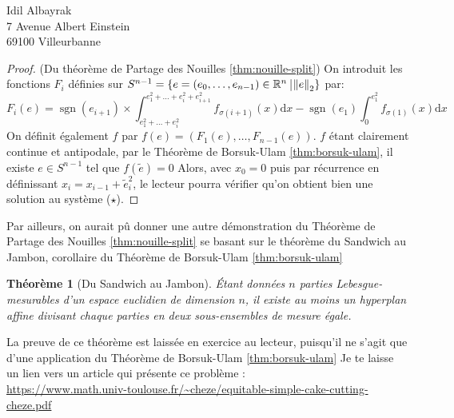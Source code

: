 \documentclass[french]{mpbmail}
\newtheorem{theorem}{Théorème}
\DeclareMathOperator{\sgn}{sgn}
\begin{document}
\begin{letter}{%
        Idil Albayrak\\
        7 Avenue Albert Einstein\\
        69100 Villeurbanne
        }
        \begin{proof}(Du théorème de Partage des Nouilles \ref*{thm:nouille-split})
            On introduit les fonctions $F_{i}$ définies sur $S^{n-1} = \left\{e = (e_{0}, \ldots, e_{n-1}) \in \mathbb{R}^{n}\ \vline \left\lVert e\right\rVert _{2} \right\}$ par:
            \begin{equation*}
                F_{i}(e) = \sgn(e_{i+1})\times \int_{e_{1}^{2} + \dots + e_{i}^{2}}^{e_{1}^{2} + \dots + e_{i}^{2} + e_{i+1}^{2}} f_{\sigma(i+1)}(x) \mathrm{d}x - \sgn(e_{1})\int_{0}^{e_{1}^{2}}f_{\sigma(1)}(x) \mathrm{d}x
            \end{equation*}
            On définit également $f$ par $f(e) = (F_{1}(e), \ldots, F_{n-1}(e))$.
            $f$ étant clairement continue et antipodale, par le Théorème de Borsuk-Ulam \ref*{thm:borsuk-ulam}, il existe $e \in S^{n-1}$ tel que $f(\tilde{e} ) = 0$
            Alors, avec $x_{0} = 0$ puis par récurrence en définissant $x_{i} = x_{i-1} + \tilde{e}_{i}^{2}$, le lecteur pourra vérifier qu'on obtient bien une solution au système ($\star$).
        \end{proof}
 
        Par ailleurs, on aurait pû donner une autre démonstration du Théorème de Partage des Nouilles \ref*{thm:nouille-split} se basant sur le théorème du Sandwich au Jambon, corollaire du Théorème de Borsuk-Ulam \ref*{thm:borsuk-ulam}                      
        
        \begin{theorem}[Du Sandwich au Jambon]
            Étant données $n$ parties \textit{Lebesgue}-mesurables d'un espace euclidien de dimension $n$, il existe au moins un hyperplan affine divisant chaque parties en deux sous-ensembles de mesure égale.
        \end{theorem}

        La preuve de ce théorème est laissée en exercice au lecteur, puisqu'il ne s'agit que d'une application du Théorème de Borsuk-Ulam \ref*{thm:borsuk-ulam}
        Je te laisse un lien vers un article qui présente ce problème : \\
        \url{https://www.math.univ-toulouse.fr/~cheze/equitable-simple-cake-cutting-cheze.pdf}

    \end{letter}
\end{document}
